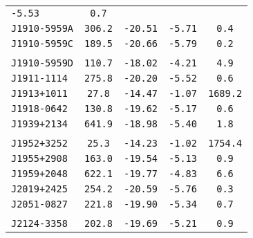 \begin{longtable}{ l | c | c | c | c }
\scriptsize{\tt{-5.53}} & \scriptsize{\tt{0.7}} \\[-16pt]
\scriptsize{\tt{J1910-5959A}} & \scriptsize{\tt{306.2}} & \scriptsize{\tt{-20.51}} &
\scriptsize{\tt{-5.71}} & \scriptsize{\tt{0.4}} \\[-16pt]
\scriptsize{\tt{J1910-5959C}} & \scriptsize{\tt{189.5}} & \scriptsize{\tt{-20.66}} &
\scriptsize{\tt{-5.79}} & \scriptsize{\tt{0.2}} \\[-16pt]
\\[-20pt]
\scriptsize{\tt{J1910-5959D}} & \scriptsize{\tt{110.7}} & \scriptsize{\tt{-18.02}} &
\scriptsize{\tt{-4.21}} & \scriptsize{\tt{4.9}} \\[-16pt]
\scriptsize{\tt{J1911-1114}} & \scriptsize{\tt{275.8}} & \scriptsize{\tt{-20.20}} &
\scriptsize{\tt{-5.52}} & \scriptsize{\tt{0.6}} \\[-16pt]
\scriptsize{\tt{J1913+1011}} & \scriptsize{\tt{27.8}} & \scriptsize{\tt{-14.47}} &
\scriptsize{\tt{-1.07}} & \scriptsize{\tt{1689.2}} \\[-16pt]
\scriptsize{\tt{J1918-0642}} & \scriptsize{\tt{130.8}} & \scriptsize{\tt{-19.62}} &
\scriptsize{\tt{-5.17}} & \scriptsize{\tt{0.6}} \\[-16pt]
\scriptsize{\tt{J1939+2134}} & \scriptsize{\tt{641.9}} & \scriptsize{\tt{-18.98}} &
\scriptsize{\tt{-5.40}} & \scriptsize{\tt{1.8}} \\[-16pt]
\\[-20pt] 
\scriptsize{\tt{J1952+3252}} & \scriptsize{\tt{25.3}} & \scriptsize{\tt{-14.23}} &
\scriptsize{\tt{-1.02}} & \scriptsize{\tt{1754.4}} \\[-16pt]
\scriptsize{\tt{J1955+2908}} & \scriptsize{\tt{163.0}} & \scriptsize{\tt{-19.54}} &
\scriptsize{\tt{-5.13}} & \scriptsize{\tt{0.9}} \\[-16pt]
\scriptsize{\tt{J1959+2048}} & \scriptsize{\tt{622.1}} & \scriptsize{\tt{-19.77}} &
\scriptsize{\tt{-4.83}} & \scriptsize{\tt{6.6}} \\[-16pt]
\scriptsize{\tt{J2019+2425}} & \scriptsize{\tt{254.2}} & \scriptsize{\tt{-20.59}} &
\scriptsize{\tt{-5.76}} & \scriptsize{\tt{0.3}} \\[-16pt]
\scriptsize{\tt{J2051-0827}} & \scriptsize{\tt{221.8}} & \scriptsize{\tt{-19.90}} &
\scriptsize{\tt{-5.34}} & \scriptsize{\tt{0.7}} \\[-16pt]
\\[-20pt] 
\scriptsize{\tt{J2124-3358}} & \scriptsize{\tt{202.8}} & \scriptsize{\tt{-19.69}} &
\scriptsize{\tt{-5.21}} & \scriptsize{\tt{0.9}} \\[-16pt]

\end{longtable}
